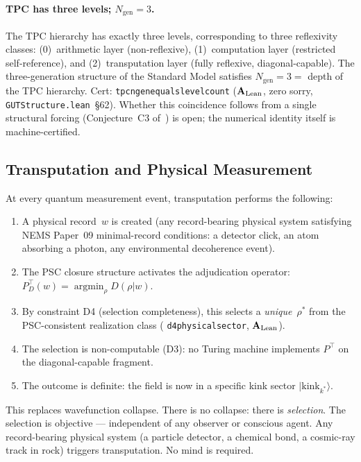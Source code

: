 \documentclass[11pt,openany]{book}
\theoremstyle{remark}
\newcommand{\lean}[1]{%
  \penalty-100
  \begingroup\def\_{\textunderscore\allowbreak}\texttt{#1}\endgroup}
\newcommand{\CatAL}{\ensuremath{\textbf{A}_{\rm Lean}}}
\begin{document}
\paragraph{TPC has three levels; $N_{\mathrm{gen}} = 3$.}
The TPC hierarchy has exactly three levels, corresponding to three reflexivity classes:
(0)~arithmetic layer (non-reflexive), (1)~computation layer (restricted self-reference),
and (2)~transputation layer (fully reflexive, diagonal-capable).  The three-generation
structure of the Standard Model satisfies $N_{\mathrm{gen}} = 3 =$ depth of the TPC
hierarchy.  Cert: \lean{tpc\_ngen\_equals\_level\_count} (\CatAL, zero sorry,
\texttt{GUTStructure.lean}~§62).  Whether this coincidence follows from a single
structural forcing (Conjecture~C3 of~\cite{SpivackGTEMobius}) is open; the numerical
identity itself is machine-certified.

\subsection*{Transputation and Physical Measurement}

At every quantum measurement event, transputation performs the following:

\begin{enumerate}
\item A physical record~$w$ is created (any record-bearing physical system satisfying
      NEMS Paper~09 minimal-record conditions: a detector click, an atom absorbing a
      photon, any environmental decoherence event).
\item The PSC closure structure activates the adjudication operator:
      $P^\top_D(w) = \operatorname{argmin}_\rho D(\rho|w)$.
\item By constraint D4 (selection completeness), this selects a \emph{unique}~$\rho^*$
      from the PSC-consistent realization class (\lean{d4\_physical\_sector}, \CatAL).
\item The selection is non-computable (D3): no Turing machine implements $P^\top$ on
      the diagonal-capable fragment.
\item The outcome is definite: the field is now in a specific kink sector
      $|\text{kink}_{k^*}\rangle$.
\end{enumerate}

This replaces wavefunction collapse.  There is no collapse: there is \emph{selection}.
The selection is objective --- independent of any observer or conscious agent.
Any record-bearing physical system (a particle detector, a chemical bond, a cosmic-ray
track in rock) triggers transputation.  No mind is required.
\end{document}
